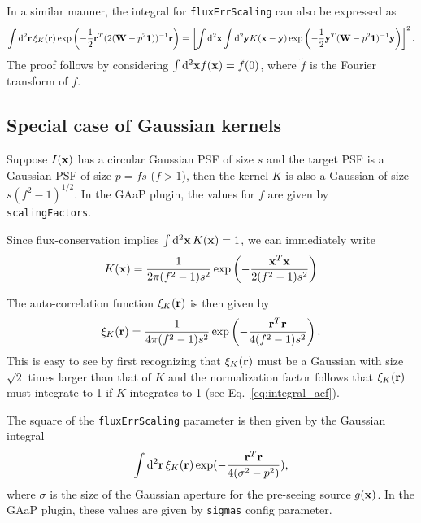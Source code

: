 \documentclass[DM,lsstdraft, authoryear,toc]{lsstdoc}
\newcommand{\rmd}{\mathrm{d}^2}
\begin{document}
In a similar manner, the integral for \texttt{fluxErrScaling} can also be expressed as
\begin{equation}
  \int\rmd {\bf r}\, \xi_{K}({\bf r}) \exp\left(-\frac{1}{2}{\bf r}^T(2({\bf W}-p^2{\bf 1}))^{-1}{\bf r}\right) =
  \left[ \int\rmd{\bf x}\int\rmd{\bf y} K({\bf x}-{\bf y}) \exp\left(-\frac{1}{2}{\bf y}^T({\bf W}-p^2{\bf 1})^{-1}{\bf y}\right)\right]^2.
\end{equation}
The proof follows by considering $\int\rmd{\bf x} f({\bf x}) = \tilde{f}(0)$, where $\tilde{f}$ is the Fourier transform of $f$.

\subsection{Special case of Gaussian kernels}
Suppose $I({\bf x})$ has a circular Gaussian PSF of size $s$ and the target PSF is a Gaussian PSF of size $p = fs$ ($f>1$), then the kernel $K$ is also a Gaussian of size $s(f^2-1)^{1/2}$. 
In the GAaP plugin, the values for $f$ are given by \texttt{scalingFactors}.

Since flux-conservation implies $\int\rmd{\bf x}\, K({\bf x}) = 1$, we can immediately write
\begin{equation}
  K({\bf x}) = \frac{1}{2\pi (f^2-1)s^2} \exp\left(-\frac{{\bf x}^T{\bf x}}{2(f^2-1)s^2}\right)
\end{equation}

The auto-correlation function $\xi_K({\bf r})$ is then given by 
\begin{equation}
  \xi_K({\bf r}) = \frac{1}{4\pi(f^2-1)s^2}\exp\left(-\frac{{\bf r}^T{\bf r}}{4(f^2-1)s^2}\right).
\end{equation}
This is easy to see by first recognizing that $\xi_K({\bf r})$ must be a Gaussian with size $\sqrt{2}$ times larger than that of $K$ and the normalization factor follows that $\xi_K({\bf r})$ must integrate to 1 if $K$ integrates to 1 (see Eq.~\ref{eq:integral_acf}).

The square of the \texttt{fluxErrScaling} parameter is then given by the Gaussian integral
\begin{equation*}
  \int\rmd{\bf r}\,\xi_K({\bf r})\exp(-\frac{{\bf r}^T{\bf r}}{4(\sigma^2-p^2)}),
\end{equation*}
where $\sigma$ is the size of the Gaussian aperture for the pre-seeing source $g({\bf x})$. In the GAaP plugin, these values are given by \texttt{sigmas} config parameter.
\end{document}
